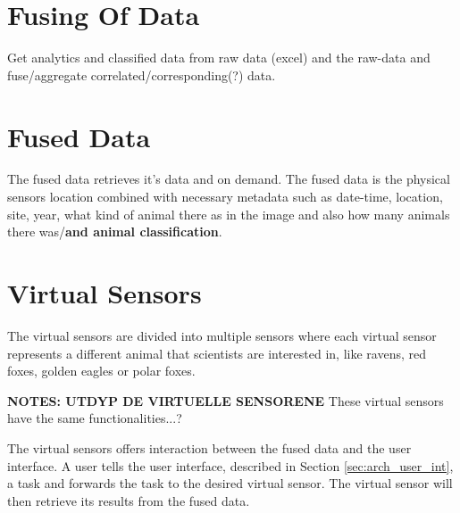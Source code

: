 \documentclass[USenglish]{uit-thesis}
\begin{document}
\section{Fusing Of Data}%
Get analytics and classified data from raw data (excel) and the raw-data and fuse/aggregate correlated/corresponding(?) data.


\section{Fused Data}%
The fused data retrieves it's data and on demand. The fused data is the physical sensors location combined with necessary metadata such as date-time, location, site, year, what kind of animal there as in the image and also how many animals there was/\textbf{and animal classification}.


\section{Virtual Sensors} \label{sec:arch_vs}
The virtual sensors are divided into multiple sensors where each virtual sensor represents a different animal that scientists are interested in, like ravens, red foxes, golden eagles or polar foxes.

\textbf{NOTES: UTDYP DE VIRTUELLE SENSORENE} 
These virtual sensors have the same functionalities...?

The virtual sensors offers interaction between the fused data and the user interface. A user tells the user interface, described in Section \ref{sec:arch_user_int}, a task and forwards the task to the desired virtual sensor. The virtual sensor will then retrieve its results from the fused data.


\end{document}

